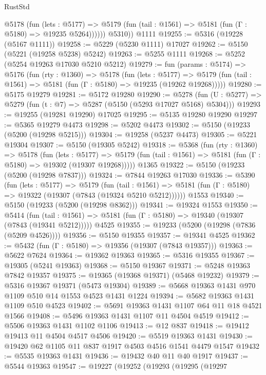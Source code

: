 \begin{lexlean}{RustStd}
\begin{coremodule}
            @5178
              (fun (lets : @5177) =>
              @5179 (fun (tail : @1561) => @5181 (fun (Γ : @5180) => @19235 @5264))))))
        @5310))
    @1111
@19255 := @5316 (@19228 (@5167 @1111))
@19258 := @5229 (@5230 @1111) @17027
@19262 := @5150 (@5221 (@19258 @5238) @5242)
@19263 := @5255 @1111
@19268 := @5252 (@5254 @19263 @17030 @5210 @5212)
@19279 := fun (params : @5174) =>
  @5176
    (fun (rty : @1360) =>
    @5178
      (fun (lets : @5177) =>
      @5179 (fun (tail : @1561) => @5181 (fun (Γ : @5180) => @19235 (@19262 @19268)))))
@19280 := @5175 @19279
@19281 := @5172 @19280
@19290 := @5278
    (fun (U : @5277) => @5279 (fun (t : @7) => @5287 (@5150 (@5293 @17027 @5168) @5304)))
@19293 := @19255 (@19281 @19290) @17025
@19295 := @5135 @19280 @19290
@19297 := @5365 @19279 @4473
@19298 := @5202 @4473
@19302 := @5150 (@19233 (@5200 (@19298 @5215)))
@19304 := @19258 (@5237 @4473)
@19305 := @5221 @19304
@19307 := @5150 (@19305 @5242)
@19318 := @5368
    (fun (rty : @1360) =>
    @5178
      (fun (lets : @5177) =>
      @5179 (fun (tail : @1561) => @5181 (fun (Γ : @5180) => @19302 (@19307 @19268)))))
    @1365
@19322 := @5150 (@19233 (@5200 (@19298 @7837)))
@19324 := @7844 @19263 @17030
@19336 := @5390
    (fun (lets : @5177) =>
    @5179
      (fun (tail : @1561) =>
      @5181 (fun (Γ : @5180) => @19322 (@19307 (@7843 (@19324 @5210 @5212))))))
    @1553
@19340 := @5150 (@19233 (@5200 (@19298 @8362)))
@19341 := @19324 @1553
@19350 := @5414
    (fun (tail : @1561) => @5181 (fun (Γ : @5180) => @19340 (@19307 (@7843 (@19341 @5212)))))
    @4525
@19355 := @19233 (@5200 (@19298 (@7836 (@5209 @4526))))
@19356 := @5150 @19355
@19357 := @19341 @4525
@19362 := @5432 (fun (Γ : @5180) => @19356 (@19307 (@7843 @19357)))
@19363 := @5622 @7624
@19364 := @19362 @19363
@19365 := @5316 @19355
@19367 := @19305 (@5241 @19363)
@19368 := @5150 @19367
@19371 := @5248 @19363 @7842 @19357
@19375 := @19365 (@19368 @19371) (@5468 @19232)
@19379 := @5316 @19367 @19371 (@5473 @19304)
@19389 := @5668 @19363 @1431 @970 @1109 @510 @14 @1553 @4523 @1431 @1224
@19394 := @5682 @19363 @1431 @1109 @510 @4523
@19402 := @5691 @19363 @1431 @1107 @64 @11 @18 @4521 @1566
@19408 := @5496 @19363 @1431 @1107 @11 @4504 @4519
@19412 := @5506 @19363 @1431 @1102 @1106
@19413 := @12 @837
@19418 := @19412 @19413 @11 @4504 @4517 @4506
@19420 := @5519 @19363 @1431
@19430 := @19420 @62 @1105 @11 @837 @1917 @4503 @4516 @1541 @4479 @1547
@19432 := @5535 @19363 @1431
@19436 := @19432 @40 @11 @40 @1917
@19437 := @5544 @19363
@19547 := @19227
    (@19252
      (@19293
        (@19295
          (@19297

\end{coremodule}
\end{lexlean}

